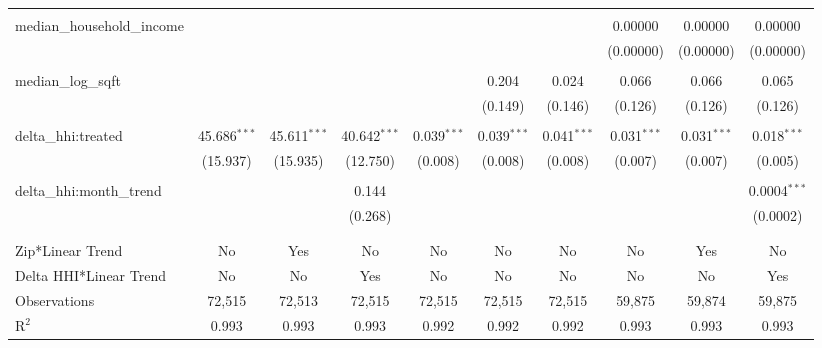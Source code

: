 \begin{table}[H]
{\begin{tabular}{@{\extracolsep{5pt}}lccccccccc}
   & & & & & & & & & \\  

  median\_household\_income &  &  &  &  &  &  & 0.00000 & 0.00000 & 0.00000 \\  

   &  &  &  &  &  &  & (0.00000) & (0.00000) & (0.00000) \\  

   & & & & & & & & & \\  

  median\_log\_sqft &  &  &  &  & 0.204 & 0.024 & 0.066 & 0.066 & 0.065 \\  

   &  &  &  &  & (0.149) & (0.146) & (0.126) & (0.126) & (0.126) \\  

   & & & & & & & & & \\  

  delta\_hhi:treated & 45.686$^{***}$ & 45.611$^{***}$ & 40.642$^{***}$ & 0.039$^{***}$ & 0.039$^{***}$ & 0.041$^{***}$ & 0.031$^{***}$ & 0.031$^{***}$ & 0.018$^{***}$ \\  

   & (15.937) & (15.935) & (12.750) & (0.008) & (0.008) & (0.008) & (0.007) & (0.007) & (0.005) \\  

   & & & & & & & & & \\  

  delta\_hhi:month\_trend &  &  & 0.144 &  &  &  &  &  & 0.0004$^{***}$ \\  

   &  &  & (0.268) &  &  &  &  &  & (0.0002) \\  

   & & & & & & & & & \\  

 \hline \\[-1.8ex]  

 Zip*Linear Trend & No & Yes & No & No & No & No & No & Yes & No \\  

 Delta HHI*Linear Trend & No & No & Yes & No & No & No & No & No & Yes \\  

 Observations & 72,515 & 72,513 & 72,515 & 72,515 & 72,515 & 72,515 & 59,875 & 59,874 & 59,875 \\  

 R$^{2}$ & 0.993 & 0.993 & 0.993 & 0.992 & 0.992 & 0.992 & 0.993 & 0.993 & 0.993 \\  


\end{tabular}}
\end{table}
